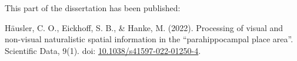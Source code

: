 This part of the dissertation has been published:

\bigbreak

\noindent
%
Häusler, C. O.,
%
Eickhoff, S. B.,
%
\& Hanke, M.
%
(2022).
%
Processing of visual and non-visual naturalistic spatial information in the
``parahippocampal place area''.
%
Scientific Data, 9(1).
%
doi: \href{https://doi.org/10.1038/s41597-022-01250-4}
{10.1038/s41597-022-01250-4}.
